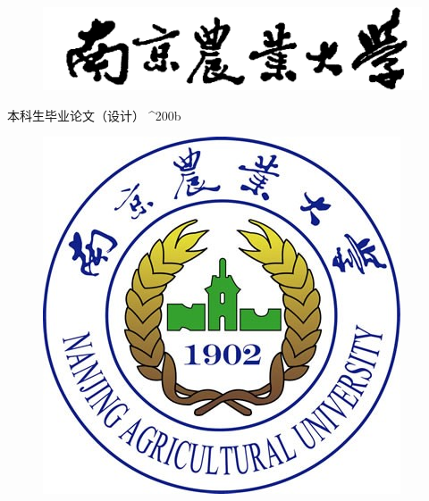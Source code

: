 \begin{figure}[!htbp]
	\centering
	\includegraphics[scale=0.11]{pic/top}
\end{figure}

\vspace{22.5pt}

\begin{center}
	{ {\fzyt 本科生毕业论文（设计）}}^^^^200b \\%
\end{center}

\vspace{42.8pt}

\begin{figure}[!htbp]
	\centering
	\includegraphics[scale=0.4244]{pic/logo}
\end{figure}

